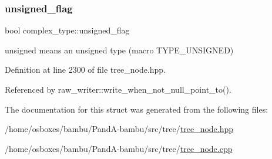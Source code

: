 \subsubsection{\texorpdfstring{unsigned\+\_\+flag}{unsigned\_flag}}
{\footnotesize\ttfamily bool complex\+\_\+type\+::unsigned\+\_\+flag}



unsigned means an unsigned type (macro T\+Y\+P\+E\+\_\+\+U\+N\+S\+I\+G\+N\+ED) 



Definition at line 2300 of file tree\+\_\+node.\+hpp.



Referenced by raw\+\_\+writer\+::write\+\_\+when\+\_\+not\+\_\+null\+\_\+point\+\_\+to().



The documentation for this struct was generated from the following files\+:\begin{DoxyCompactItemize}
\item 
/home/osboxes/bambu/\+Pand\+A-\/bambu/src/tree/\hyperlink{tree__node_8hpp}{tree\+\_\+node.\+hpp}\item 
/home/osboxes/bambu/\+Pand\+A-\/bambu/src/tree/\hyperlink{tree__node_8cpp}{tree\+\_\+node.\+cpp}\end{DoxyCompactItemize}
